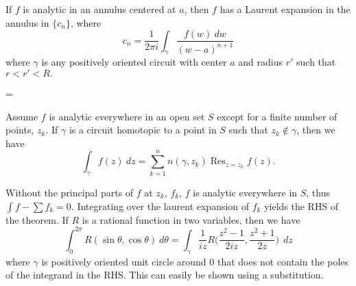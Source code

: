 \documentclass[10pt,a4paper]{book}
\begin{document}
\begin{Thm}
If $f$ is analytic in an annulus centered at $a$, then $f$ has a Laurent expansion in the annulus in $\{c_n\}$, where
$$c_n =  \dfrac{1}{2\pi i}\int_{\gamma}\dfrac{f(w)\ dw}{(w-a)^{n+1}}$$
where $\gamma$ is any positively oriented circuit with center $a$ and radius $r'$ such that $r< r'< R.$
\end{Thm}
=
\def\res{\mathop{\mathrm{Res}}}
\begin{Thm}
    Assume $f$ is analytic everywhere in an open set $S$ except for a finite number of points, $z_k$. If $\gamma$ is a circuit homotopic to a point in $S$ such that $z_k \notin  \gamma$, then we have
    $$\int_{\gamma} f(z)\ dz = \sum_{k =1}^n n(\gamma, z_k) \res_{z = z_k} f(z).$$
\end{Thm}
\PP Without the principal parts of $f$ at $z_k$, $f_k$, $f$ is analytic everywhere in $S$, thus $\int f - \sum f_k = 0.$ Integrating over the laurent expansion of $f_k$ yields the RHS of the theorem.
If $R$ is a rational function in two variables, then we have
$$\int_0^{2\pi} R(\sin \theta, \cos \theta) \ d\theta = \int_\gamma \dfrac{1}{iz}R\bigg(\dfrac{z^2 - 1}{2iz}, \dfrac{z^2 + 1}{2z}\bigg)\ \  dz$$
where $\gamma$ is positively oriented unit circle around $0$ that does not contain the poles of the integrand in the RHS. This can easily be shown using a substitution.
\end{document}
